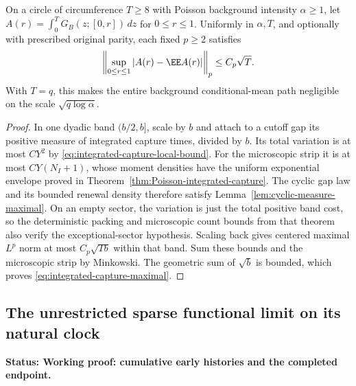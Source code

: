 \documentclass[11pt,letterpaper]{article}
\newcommand{\status}[1]{\textbf{Status: #1.}}
\begin{document}
\begin{corollary}
\label{cor:integrated-capture-maximal}
On a circle of circumference $T\ge8$ with Poisson background
intensity $\alpha\ge1$, let
$A(r)=\int_0^T G_B(z;[0,r])\,dz$ for $0\le r\le1$.
Uniformly in $\alpha,T$, and optionally with prescribed
original parity, each fixed $p\ge2$ satisfies
\begin{equation}\label{eq:integrated-capture-maximal}
 \left\|\sup_{0\le r\le1}|A(r)-\EE A(r)|\right\|_p
                      \le C_p\sqrt T.
\end{equation}
With $T=q$, this makes the entire background conditional-mean
path negligible on the scale $\sqrt{q\log\alpha}$.
\end{corollary}
\begin{proof}
In one dyadic band $(b/2,b]$, scale by $b$ and attach to a
cutoff gap its positive measure of integrated capture times,
divided by $b$. Its total variation is at most $CY^2$ by
\eqref{eq:integrated-capture-local-bound}.
For the microscopic strip it is at most $CY(N_I+1)$, whose
moment densities have the uniform exponential envelope
proved in Theorem~\ref{thm:Poisson-integrated-capture}.
The cyclic gap law and its bounded renewal density therefore
satisfy Lemma~\ref{lem:cyclic-measure-maximal}.
On an empty sector, the variation is just the total positive
band cost, so the deterministic packing and microscopic count
bounds from that theorem also verify the exceptional-sector
hypothesis. Scaling back gives centered maximal $L^p$ norm
at most $C_p\sqrt{Tb}$ within that band.
Sum these bounds and the microscopic strip by Minkowski.
The geometric sum of $\sqrt b$ is bounded, which proves
\eqref{eq:integrated-capture-maximal}.
\end{proof}

\subsection{The unrestricted sparse functional limit on its natural clock}
\label{sec:all-sparse-functional}

\status{Working proof: cumulative early histories and the completed endpoint}
\end{document}
